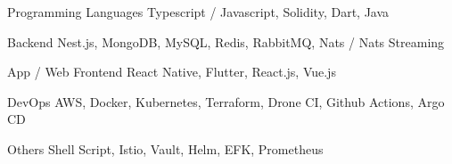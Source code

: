 


\begin{cvskills}

  \cvskill
    {Programming Languages} %
    {Typescript / Javascript, Solidity, Dart, Java} %

  \cvskill
    {Backend} %
    {Nest.js, MongoDB, MySQL, Redis, RabbitMQ, Nats / Nats Streaming } %

  \cvskill
    {App / Web Frontend} %
    {React Native, Flutter, React.js, Vue.js} %

  \cvskill
    {DevOps} %
    {AWS, Docker, Kubernetes, Terraform, Drone CI, Github Actions, Argo CD} %

  \cvskill
    {Others} %
    {Shell Script, Istio, Vault, Helm, EFK, Prometheus} %


\end{cvskills}